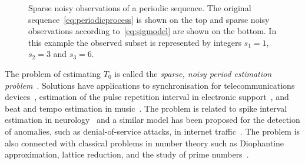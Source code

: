 \documentclass[10pt,twocolumn,twoside]{IEEEtran}
\begin{document}
{
\def\vertgap{2}
\def\ph{0.4}
\def\T{1.1}
\newcommand{\raxis}{\draw[->] (-0.25,0) -- (8,0) node[above] {$\reals$}; \draw (0,-0.06)-- node[below] {$0$} (0,0.06) }
\newcommand{\pulse}[1]{ \draw[->,>=latex] (#1,0) -- (#1,1) }
\newcommand{\pulsewithnode}[2]{ \draw[->,>=latex] (#1,0) -- node[right] {#2} (#1,1) }
\begin{figure}[t]
	\centering
{} 
		\caption{Sparse noisy observations of a periodic sequence.  The original sequence~\eqref{eq:periodicprocess} is shown on the top and sparse noisy observations according to~\eqref{eq:sigmodel} are shown on the bottom.  In this example the observed subset is represented by integers $s_1=1$, $s_2=3$ and $s_3=6$.}
		\label{fig_stat_model}
\end{figure}
}

The problem of estimating $T_0$ is called the \emph{sparse, noisy period estimation problem}~\cite{Clarkson2007,McKilliam2007}.  Solutions have applications to synchronisation for telecommunications devices~\cite{Fogel1988,Fogel1989_bit_synch_zero_crossings,Sidiropoulos2005,5621928}, estimation of the pulse repetition interval in electronic support~\cite{EltonGray_puilse_train_rader_1994,Gray_more_pri_1994,Clarkson_thesis,clarkson_estimate_period_pulse_train_1996,Hauochan_pri_2012}, and beat and tempo estimation in music~\cite{dixon_beat_extraction_2001}.  The problem is related to spike interval estimation in neurology~\cite{Arnett_neuro_pri_1976,Brillinger_spike_trains_1988,Rossoni200630} and a similar model has been proposed for the detection of anomalies, such as denial-of-service attacks, in internet traffic~\cite{He_detecting_periodic_patterns_in_internet_2006,5585849,5947313}.  The problem is also connected with classical problems in number theory such as Diophantine approximation, lattice reduction, and the study of prime numbers~\cite{Cassels_geom_numbers_1997,490557,Clarkson_thesis,Lenstra1982,Wubben_2011,536682,726812,CaseySadler_primes_2013}.
 
\end{document}
